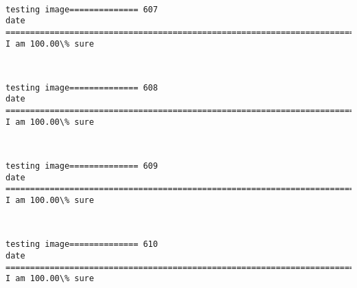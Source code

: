 \documentclass[11pt]{article}
\begin{document}
    \begin{center}
    \end{center}
    { \hspace*{\fill} \\}
    
    \begin{Verbatim}[commandchars=\\\{\}]
testing image============== 607
date
============================================================================
I am 100.00\% sure

    \end{Verbatim}

    \begin{center}
    \end{center}
    { \hspace*{\fill} \\}
    
    \begin{Verbatim}[commandchars=\\\{\}]
testing image============== 608
date
============================================================================
I am 100.00\% sure

    \end{Verbatim}

    \begin{center}
    \end{center}
    { \hspace*{\fill} \\}
    
    \begin{Verbatim}[commandchars=\\\{\}]
testing image============== 609
date
============================================================================
I am 100.00\% sure

    \end{Verbatim}

    \begin{center}
    \end{center}
    { \hspace*{\fill} \\}
    
    \begin{Verbatim}[commandchars=\\\{\}]
testing image============== 610
date
============================================================================
I am 100.00\% sure

    \end{Verbatim}
\end{document}
